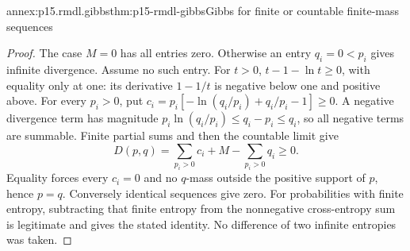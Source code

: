 \begin{annexitem}{annex:p15.rmdl.gibbs}{thm:p15-rmdl-gibbs}{Gibbs for finite or countable finite-mass sequences}
\begin{proof}
The case \(M=0\) has all entries zero. Otherwise an entry
\(q_i=0<p_i\) gives infinite divergence. Assume no such entry.
For \(t>0\), \(t-1-\ln t\geq0\), with equality only at one:
its derivative \(1-1/t\) is negative below one and positive above.
For every \(p_i>0\), put
\(c_i=p_i[-\ln(q_i/p_i)+q_i/p_i-1]\geq0\).
A negative divergence term has magnitude
\(p_i\ln(q_i/p_i)\leq q_i-p_i\leq q_i\), so all negative terms
are summable. Finite partial sums and then the countable limit give
\[
 D(p,q)=\sum_{p_i>0}c_i+M-\sum_{p_i>0}q_i\geq0.
\]
Equality forces every \(c_i=0\) and no \(q\)-mass outside the positive
support of \(p\), hence \(p=q\). Conversely identical sequences give
zero. For probabilities with finite entropy, subtracting that finite
entropy from the nonnegative cross-entropy sum is legitimate and gives
the stated identity. No difference of two infinite entropies was taken.
\end{proof}
\end{annexitem}

